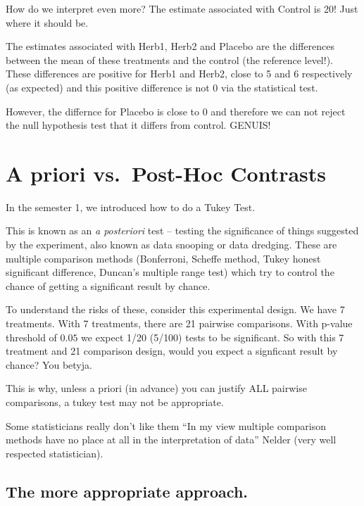 \documentclass[
]{book}
\begin{document}
How do we interpret even more? The estimate associated with Control is 20! Just where it should be.

The estimates associated with Herb1, Herb2 and Placebo are the differences between the mean of these treatments and the control (the reference level!). These differences are positive for Herb1 and Herb2, close to 5 and 6 respectively (as expected) and this positive difference is not 0 via the statistical test.

However, the differnce for Placebo is close to 0 and therefore we can not reject the null hypothesis test that it differs from control. GENUIS!

\hypertarget{a-priori-vs.-post-hoc-contrasts}{%
\section{A priori vs.~Post-Hoc Contrasts}\label{a-priori-vs.-post-hoc-contrasts}}

In the semester 1, we introduced how to do a Tukey Test.

This is known as an \emph{a posteriori} test -- testing the significance of things suggested by the experiment, also known as data snooping or data dredging. These are multiple comparison methods (Bonferroni, Scheffe method, Tukey honest significant difference, Duncan's multiple range test) which try to control the chance of getting a significant result by chance.

To understand the risks of these, consider this experimental design. We have 7 treatments. With 7 treatments, there are 21 pairwise comparisons. With p-value threshold of \(0.05\) we expect 1/20 (5/100) tests to be significant. So with this 7 treatment and 21 comparison design, would you expect a signficant result by chance? You betyja.

This is why, unless a priori (in advance) you can justify ALL pairwise comparisons, a tukey test may not be appropriate.

Some statisticians really don't like them ``In my view multiple comparison methods have no place at all in the interpretation of data'' Nelder (very well respected statistician).

\hypertarget{the-more-appropriate-approach.}{%
\subsection{The more appropriate approach.}\label{the-more-appropriate-approach.}}
\end{document}

